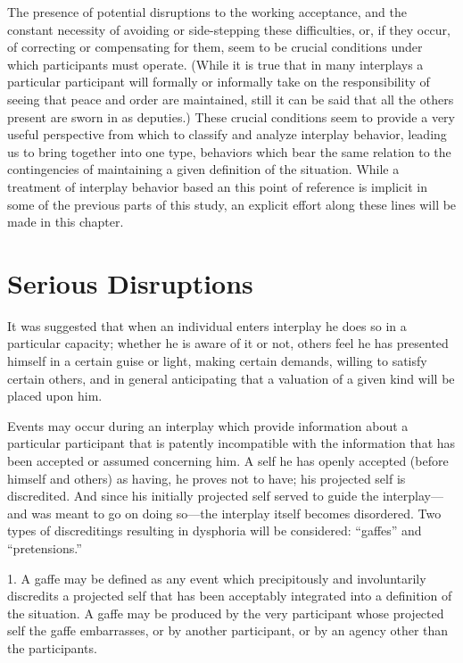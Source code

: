 \documentclass[twoside,symmetric,nobib,justified]{tufte-book}
\begin{document}
The presence of potential disruptions to the working acceptance, and the
constant necessity of avoiding or side-stepping these difficulties, or,
if they occur, of correcting or compensating for them, seem to be
crucial conditions under which participants must operate. (While it is
true that in many interplays a particular participant will formally or
informally take on the responsibility of seeing that peace and order are
maintained, still it can be said that all the others present are sworn
in as deputies.) These crucial conditions seem to provide a very useful
perspective from which to classify and analyze interplay behavior,
leading us to bring together into one type, behaviors which bear the
same relation to the contingencies of maintaining a given definition of
the situation. While a treatment of interplay behavior based an this
point of reference is implicit in some of the previous parts of this
study, an explicit effort along these lines will be made in this
chapter.

\hypertarget{serious-disruptions}{%
\section{Serious Disruptions}\label{serious-disruptions}}

It was suggested that when an individual enters interplay he does so in
a particular capacity; whether he is aware of it or not, others feel he
has presented himself in a certain guise or light, making certain
demands, willing to satisfy certain others, and in general anticipating
that a valuation of a given kind will be placed upon him.

Events may occur during an interplay which provide information about a
particular participant that is patently incompatible with the
information that has been accepted or assumed concerning him. A self he
has openly accepted (before himself and others) as having, he proves not
to have; his projected self is discredited. And since his initially
projected self served to guide the interplay---and was meant to go on
doing so---the interplay itself becomes disordered. Two types of
discreditings resulting in dysphoria will be considered: ``gaffes'' and
``pretensions.''

1. A gaffe may be defined as any event which precipitously and
involuntarily discredits a projected self that has been acceptably
integrated into a definition of the situation. A gaffe may be produced
by the very participant whose projected self the gaffe embarrasses, or
by another participant, or by an agency other than the participants.
\end{document}
